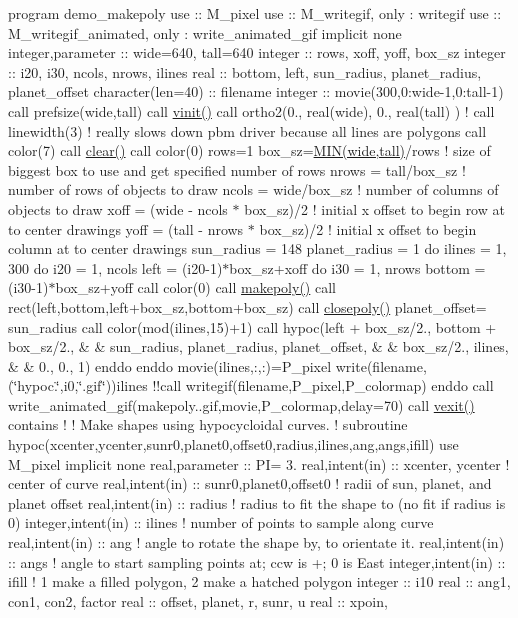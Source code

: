 program demo\+\_\+makepoly use \+:\+: M\+\_\+pixel use \+:\+: M\+\_\+writegif, only \+: writegif use \+:\+: M\+\_\+writegif\+\_\+animated, only \+: write\+\_\+animated\+\_\+gif implicit none integer,parameter \+:\+: wide=640, tall=640 integer \+:\+: rows, xoff, yoff, box\+\_\+sz integer \+:\+: i20, i30, ncols, nrows, ilines real \+:\+: bottom, left, sun\+\_\+radius, planet\+\_\+radius, planet\+\_\+offset character(len=40) \+:\+: filename integer \+:\+: movie(300,0\+:wide-\/1,0\+:tall-\/1) call prefsize(wide,tall) call \hyperlink{namespacem__pixel_ac03ca8f23fdadb60599b6ea4dc87a6d9}{vinit()} call ortho2(0., real(wide), 0., real(tall) ) ! call linewidth(3) ! really slows down pbm driver because all lines are polygons call color(7) call \hyperlink{namespacem__pixel_af3b81a21a0b2f6b5eddd09c031bd6173}{clear()} call color(0) rows=1 box\+\_\+sz=\hyperlink{C-M__system_8c_a74e75242132eaabbc1c512488a135926}{M\+I\+N(wide,tall)}/rows ! size of biggest box to use and get specified number of rows nrows = tall/box\+\_\+sz ! number of rows of objects to draw ncols = wide/box\+\_\+sz ! number of columns of objects to draw xoff = (wide -\/ ncols $\ast$ box\+\_\+sz)/2 ! initial x offset to begin row at to center drawings yoff = (tall -\/ nrows $\ast$ box\+\_\+sz)/2 ! initial x offset to begin column at to center drawings sun\+\_\+radius = 148 planet\+\_\+radius = 1 do ilines = 1, 300 do i20 = 1, ncols left = (i20-\/1)$\ast$box\+\_\+sz+xoff do i30 = 1, nrows bottom = (i30-\/1)$\ast$box\+\_\+sz+yoff call color(0) call \hyperlink{namespacem__pixel_ab7128437f95b40004bf73fc6e3f597f8}{makepoly()} call rect(left,bottom,left+box\+\_\+sz,bottom+box\+\_\+sz) call \hyperlink{namespacem__pixel_ab3dc83b63d2ab1bf3f63932abca4245d}{closepoly()} planet\+\_\+offset= sun\+\_\+radius call color(mod(ilines,15)+1) call hypoc(left + box\+\_\+sz/2., bottom + box\+\_\+sz/2., \& \& sun\+\_\+radius, planet\+\_\+radius, planet\+\_\+offset, \& \& box\+\_\+sz/2., ilines, \& \& 0., 0., 1) enddo enddo movie(ilines,\+:,\+:)=P\+\_\+pixel write(filename,\textquotesingle{}(\char`\"{}hypoc.\char`\"{},i0,\char`\"{}.\+gif\char`\"{})\textquotesingle{})ilines !!call writegif(filename,\+P\+\_\+pixel,\+P\+\_\+colormap) enddo call write\+\_\+animated\+\_\+gif(\textquotesingle{}makepoly..\+gif\textquotesingle{},movie,P\+\_\+colormap,delay=70) call \hyperlink{namespacem__pixel_a19ad6b65752322b0029a62cc0ebec3e8}{vexit()} contains ! ! Make shapes using hypocycloidal curves. ! subroutine hypoc(xcenter,ycenter,sunr0,planet0,offset0,radius,ilines,ang,angs,ifill) use M\+\_\+pixel implicit none real,parameter \+:\+: PI= 3. real,intent(in) \+:\+: xcenter, ycenter ! center of curve real,intent(in) \+:\+: sunr0,planet0,offset0 ! radii of sun, planet, and planet offset real,intent(in) \+:\+: radius ! radius to fit the shape to (no fit if radius is 0) integer,intent(in) \+:\+: ilines ! number of points to sample along curve real,intent(in) \+:\+: ang ! angle to rotate the shape by, to orientate it. real,intent(in) \+:\+: angs ! angle to start sampling points at; ccw is +; 0 is East integer,intent(in) \+:\+: ifill ! 1 make a filled polygon, 2 make a hatched polygon integer \+:\+: i10 real \+:\+: ang1, con1, con2, factor real \+:\+: offset, planet, r, sunr, u real \+:\+: xpoin, 